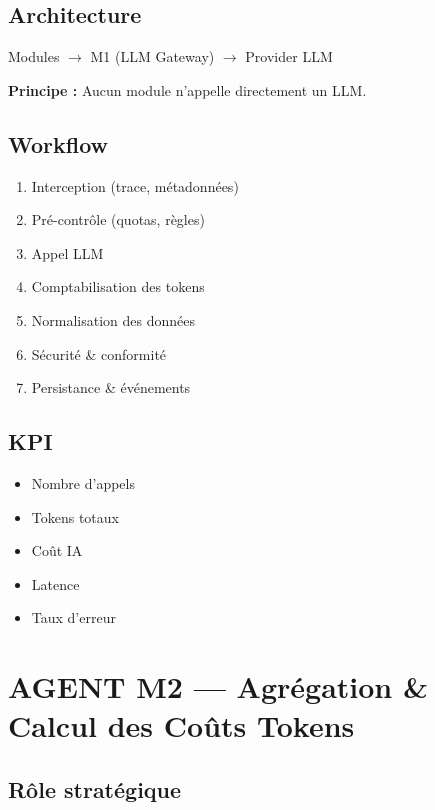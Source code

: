 \documentclass[11pt,a4paper]{article}
\begin{document}
\subsection{Architecture}

\begin{center}
Modules $\rightarrow$ M1 (LLM Gateway) $\rightarrow$ Provider LLM
\end{center}

\textbf{Principe :} Aucun module n’appelle directement un LLM.

\subsection{Workflow}

\begin{enumerate}
\item Interception (trace, métadonnées)
\item Pré-contrôle (quotas, règles)
\item Appel LLM
\item Comptabilisation des tokens
\item Normalisation des données
\item Sécurité \& conformité
\item Persistance \& événements
\end{enumerate}

\subsection{KPI}

\begin{itemize}
\item Nombre d’appels
\item Tokens totaux
\item Coût IA
\item Latence
\item Taux d’erreur
\end{itemize}

\newpage

\section{AGENT M2 --- Agrégation \& Calcul des Coûts Tokens}

\subsection{Rôle stratégique}
\end{document}
